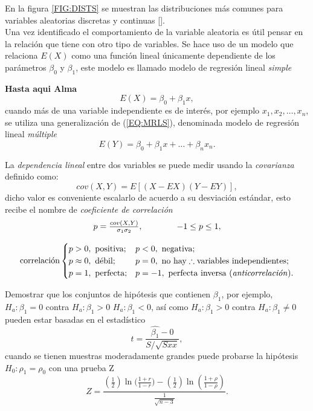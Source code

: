 \noindent En la figura \ref{FIG:DISTS} se muestran las distribuciones más comunes para variables aleatorias discretas y continuas [\cite{bala20}]. \\

\noindent Una vez identificado el comportamiento de la variable aleatoria es útil pensar en la relación que tiene con otro tipo de variables.  Se hace uso de un modelo que relaciona $E(X)$ como una función lineal únicamente dependiente de los parámetros $\beta_0$ y $\beta_1$, este modelo es llamado modelo de regresión lineal \emph{simple}

\textbf{Hasta aqui Alma}
\begin{equation}
E(X)=\beta_0+\beta_1x\label{EQ:MRLS},
\end{equation}
cuando más de una variable independiente es de interés, por ejemplo $x_1,x_2,\ldots,x_n$, se utiliza una generalización de (\ref{EQ:MRLS}), denominada modelo de regresión lineal \emph{múltiple}
\begin{equation}
E(Y)=\beta_0+\beta_1x+\ldots+\beta_nx_n.
\end{equation}


La \emph{dependencia lineal} entre dos variables se puede medir usando la \emph{covarianza} definido como:
\begin{equation}
cov(X,Y)=E[(X-EX)(Y-EY)],
\end{equation}
dicho valor es  conveniente escalarlo de acuerdo a su desviación estándar, esto recibe el nombre de  \emph{coeficiente de correlación}
\begin{equation}
\begin{matrix}
p=\frac{cov(X,Y)}{\sigma_1\sigma_2},\qquad\qquad-1\leq p\leq 1,\\\\
\text{correlación}\begin{cases}
p>0,\ \text{positiva};&p<0,\ \text{negativa};\\
p\approx0,\ \text{débil};&p=0,\ \text{no hay}\therefore\text{variables independientes};\\
p=1,\ \text{perfecta};&p=-1,\ \text{perfecta inversa (\emph{anticorrelación}).}\end{cases}\end{matrix}
\end{equation}


Demostrar que los conjuntos de hipótesis que contienen $\beta_1$, por ejemplo, $H_a\colon \beta_1 = 0$ contra $H_a\colon \beta_1 > 0$ $H_a\colon \beta_1 < 0$, así como $H_a\colon \beta_1 > 0$ contra $H_a\colon \beta_1 \neq 0$ pueden estar basadas en el estadístico
\begin{equation}
t=\frac{\hat{\beta_1}-0}{S/\sqrt{S{xx}}},
\end{equation}
cuando se tienen muestras moderadamente grandes puede probarse la hipótesis $H_0\colon \rho_1=\rho_0$ con una prueba Z
\begin{equation}
Z=\frac{(\frac{1}{2})\ln({\frac{1+r}{1-r})}-(\frac{1}{2})\ln(\frac{1+\rho}{1-\rho})}{\frac{1}{\sqrt{n-3}}}.
\end{equation}



